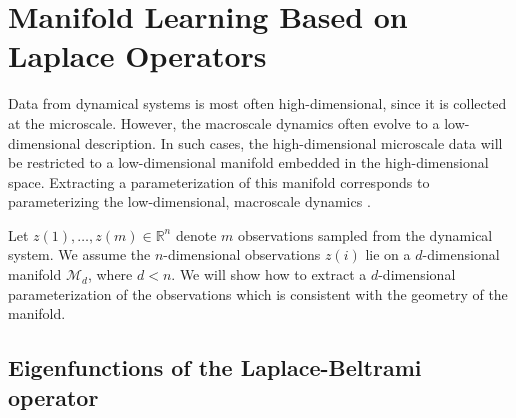\documentclass[preprint]{elsarticle}
\begin{document}
\section{Manifold Learning Based on Laplace Operators}

Data from dynamical systems is most often high-dimensional, since it is collected at the microscale.
%
However, the macroscale dynamics often evolve to a low-dimensional description. 
%
In such cases, the high-dimensional microscale data will be restricted to a low-dimensional manifold embedded in the high-dimensional space. 
%
Extracting a parameterization of this manifold corresponds to parameterizing the low-dimensional, macroscale dynamics \cite{...}.

Let $z(1), \dots, z(m) \in \mathbb{R}^n$ denote $m$ observations sampled from the dynamical system. 
%
We assume the $n$-dimensional observations $z(i)$ lie on a $d$-dimensional manifold $\mathcal{M}_d$, where $d < n$. 
%
We will show how to extract a $d$-dimensional parameterization of the observations which is consistent with the geometry of the manifold. 

\subsection{Eigenfunctions of the Laplace-Beltrami operator}
\end{document}
